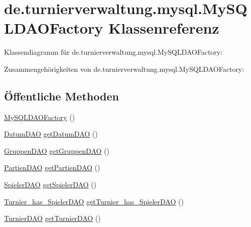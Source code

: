 \hypertarget{classde_1_1turnierverwaltung_1_1mysql_1_1_my_s_q_l_d_a_o_factory}{}\section{de.\+turnierverwaltung.\+mysql.\+My\+S\+Q\+L\+D\+A\+O\+Factory Klassenreferenz}
\label{classde_1_1turnierverwaltung_1_1mysql_1_1_my_s_q_l_d_a_o_factory}


Klassendiagramm für de.\+turnierverwaltung.\+mysql.\+My\+S\+Q\+L\+D\+A\+O\+Factory\+:


Zusammengehörigkeiten von de.\+turnierverwaltung.\+mysql.\+My\+S\+Q\+L\+D\+A\+O\+Factory\+:
\subsection*{Öffentliche Methoden}
\begin{DoxyCompactItemize}
\item 
\hyperlink{classde_1_1turnierverwaltung_1_1mysql_1_1_my_s_q_l_d_a_o_factory_a2c696144fcea709b960c1600bdbf5166}{My\+S\+Q\+L\+D\+A\+O\+Factory} ()
\item 
\hyperlink{interfacede_1_1turnierverwaltung_1_1mysql_1_1_datum_d_a_o}{Datum\+D\+AO} \hyperlink{classde_1_1turnierverwaltung_1_1mysql_1_1_my_s_q_l_d_a_o_factory_a8d039ab143df43b3286f77475fd7c79d}{get\+Datum\+D\+AO} ()
\item 
\hyperlink{interfacede_1_1turnierverwaltung_1_1mysql_1_1_gruppen_d_a_o}{Gruppen\+D\+AO} \hyperlink{classde_1_1turnierverwaltung_1_1mysql_1_1_my_s_q_l_d_a_o_factory_a55667fcbf423e6717d7f5f98f90cc478}{get\+Gruppen\+D\+AO} ()
\item 
\hyperlink{interfacede_1_1turnierverwaltung_1_1mysql_1_1_partien_d_a_o}{Partien\+D\+AO} \hyperlink{classde_1_1turnierverwaltung_1_1mysql_1_1_my_s_q_l_d_a_o_factory_afb98eef547d6ebaa339a1c13f5a13570}{get\+Partien\+D\+AO} ()
\item 
\hyperlink{interfacede_1_1turnierverwaltung_1_1mysql_1_1_spieler_d_a_o}{Spieler\+D\+AO} \hyperlink{classde_1_1turnierverwaltung_1_1mysql_1_1_my_s_q_l_d_a_o_factory_a6e1c2c33da44e8d37c61feb5a73f6d79}{get\+Spieler\+D\+AO} ()
\item 
\hyperlink{interfacede_1_1turnierverwaltung_1_1mysql_1_1_turnier__has___spieler_d_a_o}{Turnier\+\_\+has\+\_\+\+Spieler\+D\+AO} \hyperlink{classde_1_1turnierverwaltung_1_1mysql_1_1_my_s_q_l_d_a_o_factory_adabb51a32683665111744840860ccc1f}{get\+Turnier\+\_\+has\+\_\+\+Spieler\+D\+AO} ()
\item 
\hyperlink{interfacede_1_1turnierverwaltung_1_1mysql_1_1_turnier_d_a_o}{Turnier\+D\+AO} \hyperlink{classde_1_1turnierverwaltung_1_1mysql_1_1_my_s_q_l_d_a_o_factory_a3b7f5e1880f28944e177109441e3c70f}{get\+Turnier\+D\+AO} ()
\end{DoxyCompactItemize}
